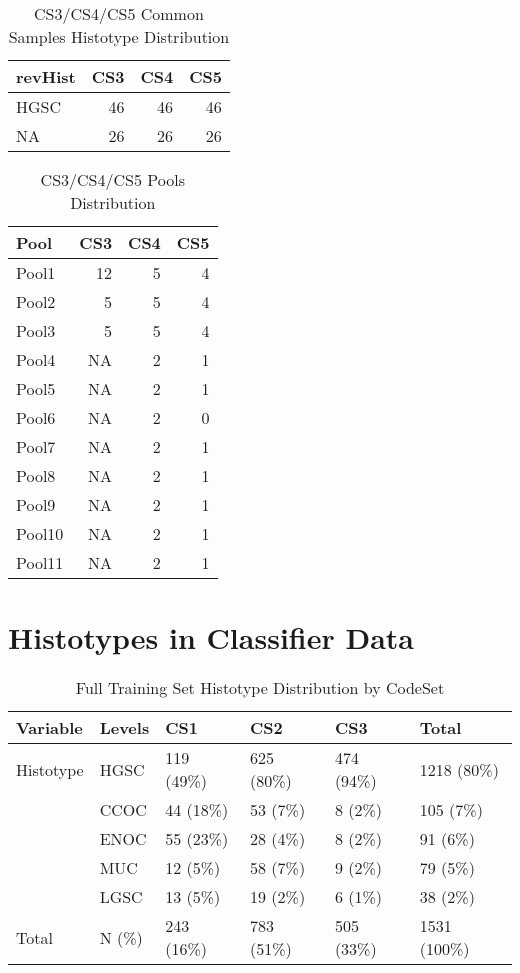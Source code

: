 \documentclass[
]{report}
\begin{document}
\begin{table}

\caption{\label{tab:cs345-overlap}CS3/CS4/CS5 Common Samples Histotype Distribution}
\centering
\begin{tabular}[t]{l|r|r|r}
\hline
revHist & CS3 & CS4 & CS5\\
\hline
HGSC & 46 & 46 & 46\\
\hline
NA & 26 & 26 & 26\\
\hline
\end{tabular}
\end{table}

\begin{table}

\caption{\label{tab:cs345-pools}CS3/CS4/CS5 Pools Distribution}
\centering
\begin{tabular}[t]{l|r|r|r}
\hline
Pool & CS3 & CS4 & CS5\\
\hline
Pool1 & 12 & 5 & 4\\
\hline
Pool2 & 5 & 5 & 4\\
\hline
Pool3 & 5 & 5 & 4\\
\hline
Pool4 & NA & 2 & 1\\
\hline
Pool5 & NA & 2 & 1\\
\hline
Pool6 & NA & 2 & 0\\
\hline
Pool7 & NA & 2 & 1\\
\hline
Pool8 & NA & 2 & 1\\
\hline
Pool9 & NA & 2 & 1\\
\hline
Pool10 & NA & 2 & 1\\
\hline
Pool11 & NA & 2 & 1\\
\hline
\end{tabular}
\end{table}

\hypertarget{histotypes-in-classifier-data}{%
\section{Histotypes in Classifier Data}\label{histotypes-in-classifier-data}}

\begin{table}

\caption{\label{tab:train-hist-codeset}Full Training Set Histotype Distribution by CodeSet}
\centering
\begin{tabular}[t]{l|l|l|l|l|l}
\hline
Variable & Levels & CS1 & CS2 & CS3 & Total\\
\hline
Histotype & HGSC & 119 (49\%) & 625 (80\%) & 474 (94\%) & 1218 (80\%)\\
\hline
 & CCOC & 44 (18\%) & 53 (7\%) & 8 (2\%) & 105 (7\%)\\
\hline
 & ENOC & 55 (23\%) & 28 (4\%) & 8 (2\%) & 91 (6\%)\\
\hline
 & MUC & 12 (5\%) & 58 (7\%) & 9 (2\%) & 79 (5\%)\\
\hline
 & LGSC & 13 (5\%) & 19 (2\%) & 6 (1\%) & 38 (2\%)\\
\hline
Total & N (\%) & 243 (16\%) & 783 (51\%) & 505 (33\%) & 1531 (100\%)\\
\hline
\end{tabular}
\end{table}
\end{document}
